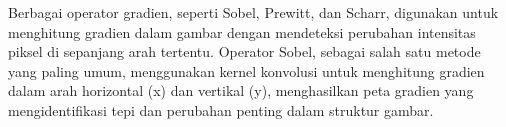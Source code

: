   Berbagai operator gradien, seperti Sobel, Prewitt, dan Scharr, digunakan untuk menghitung gradien dalam gambar dengan mendeteksi perubahan intensitas piksel di sepanjang arah tertentu. 
Operator Sobel, sebagai salah satu metode yang paling umum, menggunakan kernel konvolusi untuk menghitung gradien dalam arah horizontal (x) dan vertikal (y), menghasilkan peta gradien yang mengidentifikasi tepi dan perubahan penting dalam struktur gambar.



